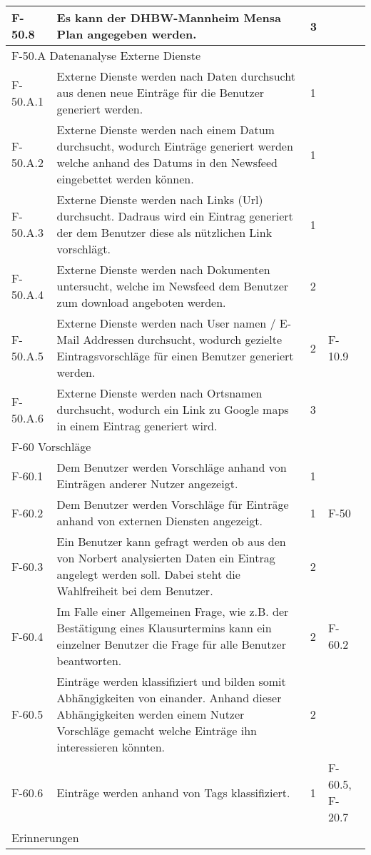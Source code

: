 \begin{tabularx}{\textwidth}{|l|X|l|l|}
    F-50.8 & Es kann der DHBW-Mannheim Mensa Plan angegeben werden. & 3 & \\
    \hline
    \multicolumn{4}{|l|}{F-50.A Datenanalyse Externe Dienste}\\
    \hline
    F-50.A.1 & Externe Dienste werden nach Daten durchsucht aus denen neue Einträge für die Benutzer generiert werden. & 1 & \\
    F-50.A.2 & Externe Dienste werden nach einem Datum durchsucht, wodurch Einträge generiert werden welche anhand des Datums in den Newsfeed eingebettet werden können. & 1 & \\
    F-50.A.3 & Externe Dienste werden nach Links (Url) durchsucht. Dadraus wird ein Eintrag generiert der dem Benutzer diese als nützlichen Link vorschlägt. & 1 & \\
    F-50.A.4 & Externe Dienste werden nach Dokumenten untersucht, welche im Newsfeed dem Benutzer zum download angeboten werden. & 2 & \\
    F-50.A.5 & Externe Dienste werden nach User namen / E-Mail Addressen durchsucht, wodurch gezielte Eintragsvorschläge für einen Benutzer generiert werden. & 2 & F-10.9 \\
    F-50.A.6 & Externe Dienste werden nach Ortsnamen durchsucht, wodurch ein Link zu Google maps in einem Eintrag generiert wird. & 3 & \\
    \hline
    \multicolumn{4}{|l|}{F-60 Vorschläge}\\
    \hline 
    F-60.1 & Dem Benutzer werden Vorschläge anhand von Einträgen anderer Nutzer angezeigt. & 1 & \\
    F-60.2 & Dem Benutzer werden Vorschläge für Einträge anhand von externen Diensten angezeigt. & 1 & F-50 \\
    F-60.3 & Ein Benutzer kann gefragt werden ob aus den von Norbert analysierten Daten ein Eintrag angelegt werden soll. Dabei steht die Wahlfreiheit bei dem Benutzer. & 2 & \\
    F-60.4 & Im Falle einer Allgemeinen Frage, wie z.B. der Bestätigung eines Klausurtermins kann ein einzelner Benutzer die Frage für alle Benutzer beantworten. & 2 & F-60.2 \\
    F-60.5 & Einträge werden klassifiziert und bilden somit Abhängigkeiten von einander. Anhand dieser Abhängigkeiten werden einem Nutzer Vorschläge gemacht welche Einträge ihn interessieren könnten. & 2 & \\
    F-60.6 & Einträge werden anhand von Tags klassifiziert. & 1 & F-60.5, F-20.7\\
    \hline
    \multicolumn{4}{|l|}{Erinnerungen}\\
    \hline


\end{tabularx}
